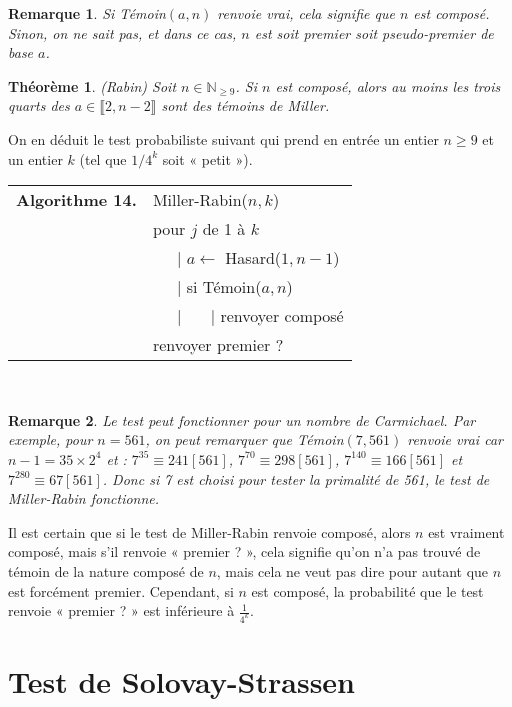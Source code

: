 \documentclass[12pt]{report}
\newtheorem{thm}{Théorème}[chapter]
\newtheorem*{rem}{Remarque}
\newcommand{\N}{\mathbb{N}}
\begin{document}
\begin{rem}
Si Témoin$(a,n)$ renvoie vrai, cela signifie que $n$ est composé. Sinon, on ne sait pas, et dans ce cas, $n$ est soit premier soit pseudo-premier de base $a$.
\end{rem}

\begin{thm}(Rabin)
Soit $n\in \N_{\geq 9}$. Si $n$ est composé, alors au moins les trois quarts des $a\in \llbracket 2,n-2\rrbracket$ sont des témoins de Miller.
\end{thm}


On en déduit le test probabiliste suivant qui prend en entrée un entier $n\geq 9$ et un entier $k$ (tel que $1/4^k$ soit « petit »). 

\begin{tabular}{ll}
\textbf{Algorithme 14.} & Miller-Rabin($n,k$)\\
           & pour $j$ de 1 à $k$ \\
           & \ \ \ {\rm |} $a \leftarrow$ Hasard($1,n-1$) \\      
           & \ \ \ {\rm |} si Témoin($a,n$) \\
           & \ \ \ {\rm |} \ \ \ {\rm |} renvoyer composé \\
           & renvoyer premier ?
\end{tabular}\\

\begin{rem}
Le test peut fonctionner pour un nombre de Carmichael. Par exemple, pour $n=561$, on peut remarquer que Témoin$(7,561)$ renvoie vrai car $n-1=35 \times 2^4$ et : $7^{35}\equiv 241 [561]$, $7^{70}\equiv 298 [561]$, $7^{140}\equiv 166 [561]$ et $7^{280}\equiv 67 [561]$. Donc si 7 est choisi pour tester la primalité de 561, le test de Miller-Rabin fonctionne.
\end{rem}


Il est certain que si le test de Miller-Rabin renvoie composé, alors $n$ est vraiment composé, mais s'il renvoie « premier ? », cela signifie qu'on n'a pas trouvé de témoin de la nature composé de $n$, mais cela ne veut pas dire pour autant que $n$ est forcément premier. Cependant, si $n$ est composé, la probabilité que le test renvoie « premier ? » est inférieure à $\frac{1}{4^k}$.



\section{Test de Solovay-Strassen}
\end{document}
